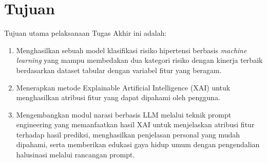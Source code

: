 \section{Tujuan}
Tujuan utama pelaksanaan Tugas Akhir ini adalah:
\begin{enumerate}
\item Menghasilkan sebuah model klasifikasi risiko hipertensi berbasis \textit{machine learning} yang mampu membedakan dua kategori risiko dengan kinerja terbaik berdasarkan dataset tabular dengan variabel fitur yang beragam.
\item Menerapkan metode Explainable Artificial Intelligence (XAI) untuk menghasilkan atribusi fitur yang dapat dipahami oleh pengguna.
\item Mengembangkan modul narasi berbasis LLM melalui teknik prompt engineering yang memanfaatkan hasil XAI untuk menjelaskan atribusi fitur terhadap hasil prediksi, menghasilkan penjelasan personal yang mudah dipahami, serta memberikan edukasi gaya hidup umum dengan pengendalian halusinasi melalui rancangan prompt.
\end{enumerate}

